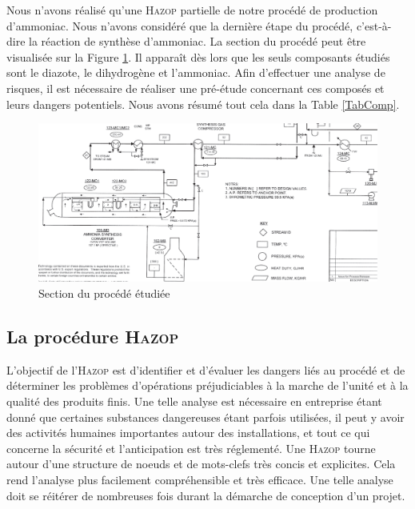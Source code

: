 Nous n'avons réalisé qu'une \textsc{Hazop} partielle de notre procédé de production d'ammoniac. Nous n'avons considéré 
que la dernière étape du procédé, c'est-à-dire la réaction de synthèse d'ammoniac. La section du procédé peut être visualisée 
sur la Figure \ref{section_procede}. Il apparaît dès lors que les seuls composants étudiés sont le diazote, le dihydrogène 
et l'ammoniac. Afin d'effectuer une analyse de risques, il est nécessaire de réaliser une pré-étude concernant ces composés 
et leurs dangers potentiels. Nous avons résumé tout cela dans la Table \ref{TabComp}.\cite{CSST}\cite{Ontario}

\begin{figure}[ht!]
 \centering
 \includegraphics[scale=0.3]{section_procede.PNG}
 \caption{Section du procédé étudiée}
 \label{section_procede}
\end{figure}

\subsection{La procédure \textsc{Hazop}}

L’objectif de l’\textsc{Hazop} est d’identifier et d’évaluer les dangers liés au procédé et de déterminer les problèmes 
d’opérations préjudiciables à la marche de l’unité et à la qualité des produits finis. Une telle analyse est nécessaire 
en entreprise étant donné que certaines substances dangereuses étant parfois utilisées, il peut y avoir des activités 
humaines importantes autour des installations, et tout ce qui concerne la sécurité et l'anticipation est très réglementé.
Une \textsc{Hazop} tourne autour d'une structure de noeuds et de mots-clefs très concis et explicites. Cela rend l'analyse 
plus facilement compréhensible et très efficace.
Une telle analyse doit se réitérer de nombreuses fois durant la démarche de conception d'un projet.\cite{icamp}

